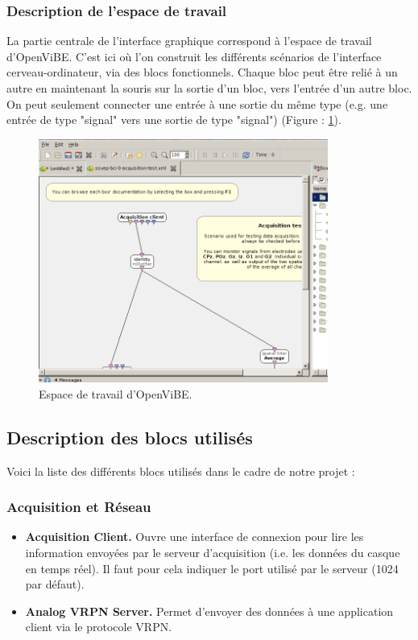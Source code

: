 \subsubsection{Description de l'espace de travail}
\label{Subsubsection : 5.Description de l'espace de travail}
La partie centrale de l'interface graphique correspond à l'espace de travail d'OpenViBE. C'est ici où l'on construit les différents scénarios de l'interface cerveau-ordinateur, via des blocs fonctionnels. Chaque bloc peut être relié à un autre en maintenant la souris sur la sortie d'un bloc, vers l'entrée d'un autre bloc. On peut seulement connecter une entrée à une sortie du même type (e.g. une entrée de type "signal" vers une sortie de type "signal") (Figure : \ref{fig:interface_travail_ov}).

\begin{figure}[h]
	\centering\includegraphics[height=8cm]{images/interface_travail_ov.png}
	\caption{Espace de travail d'OpenViBE.}
	\label{fig:interface_travail_ov}
\end{figure}

\subsection{Description des blocs utilisés}
\label{Subsection : 5.Description des blocs utilisés}
Voici la liste des différents blocs utilisés dans le cadre de notre projet :

\subsubsection{Acquisition et Réseau}
\label{Subsubsection : 5.Acquisition et Réseau}
\begin{itemize}
	\smallbreak
	\item \textbf{Acquisition Client.} Ouvre une interface de connexion pour lire les information envoyées par le serveur d'acquisition (i.e. les données du casque en temps réel). Il faut pour cela indiquer le port utilisé par le serveur (1024 par défaut).
	\smallbreak
	\item \textbf{Analog VRPN Server.} Permet d'envoyer des données à une application client via le protocole VRPN.
\end{itemize}
